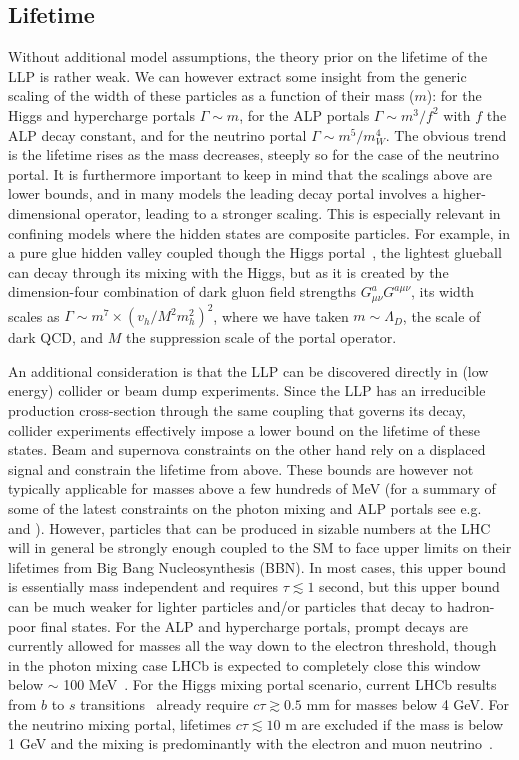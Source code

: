 \subsection{Lifetime}
\label{sec:darkshowerctau}

Without additional model assumptions, the theory prior on the lifetime of the LLP is rather weak. We can however extract some insight from the generic scaling of the width of these particles as a function of their mass ($m$): for the Higgs and hypercharge portals $\Gamma\sim m$, for the ALP portals $\Gamma\sim m^3/f^2$ with $f$ the ALP decay constant, and for the neutrino portal $\Gamma \sim m^5/m_W^4$. The obvious trend is the lifetime rises as the mass decreases, steeply so for the case of the neutrino portal. It is furthermore important to keep in mind that the scalings above are lower bounds, and in many models the leading decay portal involves a higher-dimensional operator, leading to a stronger scaling. This is especially relevant in confining  models where the hidden states are composite particles. For example, in a pure glue hidden valley coupled though the Higgs portal~\cite{Juknevich:2009gg}, the lightest glueball can decay through its mixing with the Higgs, but as it is created by the dimension-four combination of dark gluon field strengths $G^a_{\mu\nu}G^{a \mu\nu}$, its width scales as $\Gamma\sim m^7 \times (v_h/M^2 m_h^2)^2$, where we have taken $m\sim \Lambda_D$, the scale of dark QCD, and $M$ the suppression scale of the portal operator.

An additional consideration is that the LLP can be discovered directly in (low energy) collider or beam dump experiments. Since the LLP has an irreducible production cross-section through the same coupling that governs its decay, collider experiments effectively impose a lower bound on the lifetime of these states. Beam and supernova constraints on the other hand rely on a displaced signal and constrain the lifetime from above. These bounds are however not typically applicable for masses above a few hundreds of MeV (for a summary of some of the latest constraints on the photon mixing and ALP portals see e.g.~\cite{Ilten:2018crw} and \cite{Bauer:2017ris}).   However, particles that can be produced in sizable numbers at the LHC will in general be strongly enough coupled to the SM to face upper limits on their lifetimes from Big Bang Nucleosynthesis (BBN).   In most cases, this upper bound is essentially mass independent and requires $\tau\lesssim 1$ second, but this upper bound can be much weaker for lighter particles and/or particles that decay to hadron-poor final states.  For the ALP and hypercharge portals, prompt decays are currently allowed for masses all the way down to the electron threshold, though in the photon mixing case LHCb is expected to completely close this window below $\sim$ 100 MeV~\cite{Ilten:2015hya,Ilten:2016tkc}. For the Higgs mixing portal scenario, current LHCb results from $b$ to $s$ transitions~\cite{Aaij:2015tna,Aaij:2016qsm} already require $c\tau \gtrsim 0.5$ mm for masses below 4 GeV. For the neutrino mixing portal, lifetimes $c\tau\lesssim 10$ m are excluded if the mass is below 1 GeV and the mixing is predominantly with the electron and muon neutrino~\cite{Deppisch:2015qwa}.

